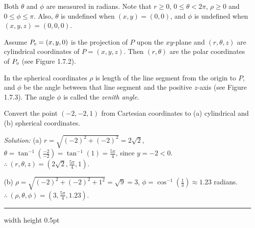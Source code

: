 \vspace{6mm}
\vspace{2mm}

\par Both $\theta$ and $\phi$ are measured in radians.
Note that $r \ge 0$, $0 \le \theta < 2\pi$, $\rho \ge 0$ and $0 \le \phi \le \pi$.
Also, $\theta$ is undefined when $(x,y) = (0,0)$, and $\phi$ is undefined when $(x,y,z) = (0,0,0)$.

Assume $P_{\scriptscriptstyle 0} = (x,y,0)$ is the projection of $P$ upon the
$xy$-plane and $(r,\theta,z)$ are cylindrical coordinates of $P=(x,y,z)$.
Then $(r,\theta)$ are the polar coordinates of $P_{\scriptscriptstyle 0}$ (see
Figure 1.7.2).

In the spherical coordinates
$\rho$ is length of the line segment from the origin to $P$, 
and $\phi$ be the angle between that line segment
and the positive $z$-axis (see Figure 1.7.3).
The angle $\phi$ is called the \emph{zenith angle}. 

\begin{exmp}
 Convert the point $(-2,-2,1)$ from Cartesian coordinates to (a) cylindrical and (b) spherical
 coordinates.\vspace{1.5mm}
 \par\noindent\emph{Solution:} (a) $r = \sqrt{(-2)^2 + (-2)^2} = 2\sqrt{2}$, $\theta =
 \tan^{-1} \left( \frac{-2}{-2} \right) = \tan^{-1}(1) = \frac{5 \pi}{4}$, since $y = -2 < 0$.\\
 $\therefore ~ (r,\theta,z) = \left( 2\sqrt{2},\frac{5 \pi}{4},1 \right)$.\vspace{2mm}
 \par\noindent (b) $\rho = \sqrt{(-2)^2 + (-2)^2 + 1^2} = \sqrt{9} = 3$, $\phi = \cos^{-1} \left( \frac{1}{3} \right)
 \approx 1.23$ radians.\\
 $\therefore ~ (\rho,\theta,\phi) = \left( 3,\frac{5 \pi}{4}, 1.23 \right)$.
 \end{exmp}
\hrule width \textwidth height 0.5pt
\vspace{2mm}

